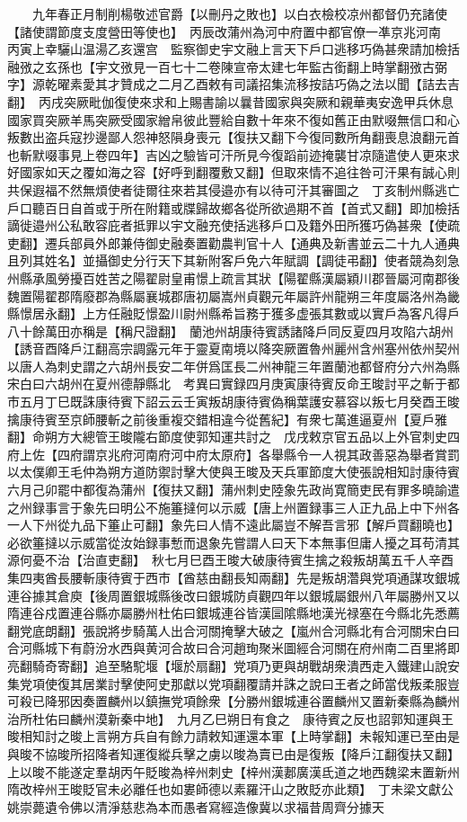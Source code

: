　　九年春正月制削楊敬述官爵【以刪丹之敗也】以白衣檢校凉州都督仍充諸使【諸使謂節度支度營田等使也】　丙辰改蒲州為河中府置中都官僚一凖京兆河南　丙寅上幸驪山温湯乙亥還宫　監察御史宇文融上言天下戶口逃移巧偽甚衆請加檢括融㢸之玄孫也【宇文㢸見一百七十二卷陳宣帝太建七年監古銜翻上時掌翻㢸古弼字】源乾曜素愛其才贊成之二月乙酉敕有司議招集流移按詰巧偽之法以聞【詰去吉翻】　丙戌突厥毗伽復使來求和上賜書諭以曩昔國家與突厥和親華夷安逸甲兵休息國家買突厥羊馬突厥受國家繒帛彼此豐給自數十年來不復如舊正由默啜無信口和心叛數出盗兵寇抄邊鄙人怨神怒隕身喪元【復扶又翻下今復同數所角翻喪息浪翻元首也斬默啜事見上卷四年】吉凶之驗皆可汗所見今復蹈前迹掩襲甘凉隨遣使人更來求好國家如天之覆如海之容【好呼到翻覆敷又翻】但取來情不追往咎可汗果有誠心則共保遐福不然無煩使者徒爾往來若其侵邉亦有以待可汗其審圖之　丁亥制州縣逃亡戶口聽百日自首或于所在附籍或牒歸故鄉各從所欲過期不首【首式又翻】即加檢括謫徙邉州公私敢容庇者抵罪以宇文融充使括逃移戶口及籍外田所獲巧偽甚衆【使疏吏翻】遷兵部員外郎兼侍御史融奏置勸農判官十人【通典及新書並云二十九人通典且列其姓名】並攝御史分行天下其新附客戶免六年賦調【調徒弔翻】使者競為刻急州縣承風勞擾百姓苦之陽翟尉皇甫憬上疏言其狀【陽翟縣漢屬穎川郡晉屬河南郡後魏置陽翟郡隋廢郡為縣屬襄城郡唐初屬嵩州貞觀元年屬許州龍朔三年度屬洛州為畿縣憬居永翻】上方任融貶憬盈川尉州縣希旨務于獲多虚張其數或以實戶為客凡得戶八十餘萬田亦稱是【稱尺證翻】　蘭池州胡康待賓誘諸降戶同反夏四月攻陷六胡州【誘音酉降戶江翻高宗調露元年于靈夏南境以降突厥置魯州麗州含州塞州依州契州以唐人為刺史謂之六胡州長安二年併爲匡長二州神龍三年置蘭池都督府分六州為縣宋白曰六胡州在夏州德靜縣北　考異曰實録四月庚寅康待賓反命王晙討平之斬于都市五月丁巳既誅康待賓下詔云云壬寅叛胡康待賓偽稱葉護安慕容以叛七月癸酉王晙擒康待賓至京師腰斬之前後重複交錯相違今從舊紀】有衆七萬進逼夏州【夏戶雅翻】命朔方大總管王晙隴右節度使郭知運共討之　戊戌敕京官五品以上外官刺史四府上佐【四府謂京兆府河南府河中府太原府】各舉縣令一人視其政善惡為舉者賞罰　以太僕卿王毛仲為朔方道防禦討擊大使與王晙及天兵軍節度大使張說相知討康待賓　六月己卯罷中都復為蒲州【復扶又翻】蒲州刺史陸象先政尚寛簡吏民有罪多曉諭遣之州録事言于象先曰明公不施箠撻何以示威【唐上州置録事三人正九品上中下州各一人下州從九品下箠止可翻】象先曰人情不遠此屬豈不解吾言邪【解戶買翻曉也】必欲箠撻以示威當從汝始録事慙而退象先嘗謂人曰天下本無事但庸人擾之耳苟清其源何憂不治【治直吏翻】　秋七月巳酉王晙大破康待賓生擒之殺叛胡萬五千人辛酉集四夷酋長腰斬康待賓于西市【酋慈由翻長知兩翻】先是叛胡濳與党項通謀攻銀城連谷據其倉庾【後周置銀城縣後改曰銀城防貞觀四年以銀城屬銀州八年屬勝州又以隋連谷戍置連谷縣亦屬勝州杜佑曰銀城連谷皆漢圁隂縣地漢光禄塞在今縣北先悉薦翻党底朗翻】張說將步騎萬人出合河關掩擊大破之【嵐州合河縣北有合河關宋白曰合河縣城下有蔚汾水西與黄河合故曰合河趙珣聚米圖經合河關在府州南二百里將即亮翻騎奇寄翻】追至駱駝堰【堰於扇翻】党項乃更與胡戰胡衆潰西走入鐵建山說安集党項使復其居業討擊使阿史那獻以党項翻覆請并誅之說曰王者之師當伐叛柔服豈可殺已降邪因奏置麟州以鎮撫党項餘衆【分勝州銀城連谷置麟州又置新秦縣為麟州治所杜佑曰麟州漠新秦中地】　九月乙巳朔日有食之　康待賓之反也詔郭知運與王晙相知討之晙上言朔方兵自有餘力請敕知運還本軍【上時掌翻】未報知運已至由是與晙不協晙所招降者知運復縱兵擊之虜以晙為賣已由是復叛【降戶江翻復扶又翻】上以晙不能遂定羣胡丙午貶晙為梓州刺史【梓州漢郪廣漢氐道之地西魏梁末置新州隋改梓州王晙貶官未必離任也如婁師德以素羅汗山之敗貶亦此類】　丁未梁文獻公姚崇薨遺令佛以清淨慈悲為本而愚者寫經造像冀以求福昔周齊分據天